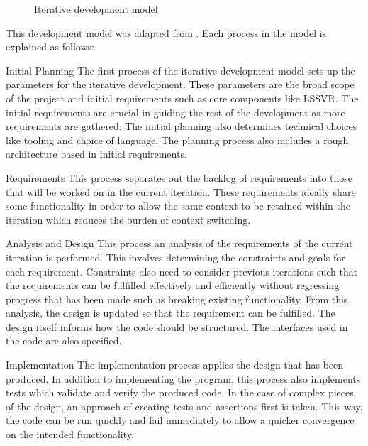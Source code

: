 \begin{figure}[H]
      \centering
      \begin{adjustbox}{max width=\textwidth}
      \end{adjustbox}
      \caption{Iterative development model}\label{fig:iterative_development_diagram}
\end{figure}

This development model was adapted from \textcite{bittnerManagingIterativeSoftware2006}. Each process in the model is explained as follows:
\begin{numdesc}
      \item[Initial Planning]
      The first process of the iterative development model sets up the parameters for the iterative development. These parameters are the broad scope of the project and initial requirements such as core components like LSSVR\@. The initial requirements are crucial in guiding the rest of the development as more requirements are gathered. The initial planning also determines technical choices like tooling and choice of language. The planning process also includes a rough architecture based in initial requirements.

      \item[Requirements]
      This process separates out the backlog of requirements into those that will be worked on in the current iteration. These requirements ideally share some functionality in order to allow the same context to be retained within the iteration which reduces the burden of context switching.

      \item[Analysis and Design]
      This process an analysis of the requirements of the current iteration is performed. This involves determining the constraints and goals for each requirement. Constraints also need to consider previous iterations such that the requirements can be fulfilled effectively and efficiently without regressing progress that has been made such as breaking existing functionality. From this analysis, the design is updated so that the requirement can be fulfilled. The design itself informs how the code should be structured. The interfaces used in the code are also specified.

      \item[Implementation]
      The implementation process applies the design that has been produced. In addition to implementing the program, this process also implements tests which validate and verify the produced code. In the case of complex pieces of the design, an approach of creating tests and assertions first is taken. This way, the code can be run quickly and fail immediately to allow a quicker convergence on the intended functionality.


\end{numdesc}
